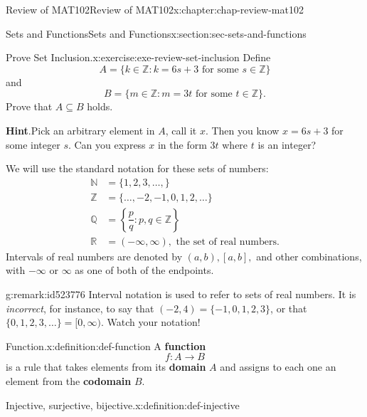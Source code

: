 \documentclass[oneside,10pt,]{book}
\newcommand{\blocktitlefont}{\relax}
\newcommand{\terminology}[1]{\textbf{#1}}
\numberwithin{equation}{section}
\newcommand{\amp}{&}
\begin{document}
\begin{chapterptx}{Review of MAT102}{}{Review of MAT102}{}{}{x:chapter:chap-review-mat102}
\begin{sectionptx}{Sets and Functions}{}{Sets and Functions}{}{}{x:section:sec-sets-and-functions}
\begin{inlineexercise}{Prove Set Inclusion.}{x:exercise:exe-review-set-inclusion}%
Define%
\begin{equation*}
A = \{k \in \mathbb{Z} : k = 6s + 3 \text{ for some } s \in \mathbb{Z}\}
\end{equation*}
and%
\begin{equation*}
B = \{m \in \mathbb{Z} : m = 3t \text{ for some } t \in \mathbb{Z}\}\text{.}
\end{equation*}
Prove that \(A \subseteq B\) holds.%
\par\smallskip%
\noindent\textbf{\blocktitlefont Hint}.\hypertarget{g:hint:id523676}{}\quad{}Pick an arbitrary element in \(A\), call it \(x\). Then you know \(x = 6s + 3\) for some integer \(s\). Can you express \(x\) in the form \(3t\) where \(t\) is an integer?%
\end{inlineexercise}%
We will use the standard notation for these sets of numbers: \label{g:notation:id523701}\label{g:notation:id523711}\label{g:notation:id523687}\label{g:notation:id523752}\label{g:notation:id523729}%
\begin{align*}
\mathbb{N} \amp = \{1,2,3,\ldots,\}\\
\mathbb{Z} \amp = \{\ldots,-2,-1,0,1,2,\ldots\}\\
\mathbb{Q} \amp = \left\{\dfrac{p}{q} : p,q \in \mathbb{Z}\right\}\\
\mathbb{R} \amp = (-\infty,\infty), \text{ the set of real numbers.}
\end{align*}
Intervals of real numbers are denoted by \((a,b), [a,b],\) and other combinations, with \(-\infty\) or \(\infty\) as one of both of the endpoints.%
\begin{remark}{}{g:remark:id523776}%
Interval notation is used to refer to sets of real numbers. It is \emph{incorrect}, for instance, to say that \((-2,4) = \{-1,0,1,2,3\}\), or that \(\{0,1,2,3,\ldots\} = [0,\infty)\). Watch your notation!%
\end{remark}
\begin{definition}{Function.}{x:definition:def-function}%
\label{g:notation:id523767} A \terminology{function}%
\begin{equation*}
f: A \rightarrow B
\end{equation*}
is a rule that takes elements from its \terminology{domain} \(A\) and assigns to each one an element from the \terminology{codomain} \(B\).%
\end{definition}
\begin{definition}{Injective, surjective, bijective.}{x:definition:def-injective}%

\end{definition}
\end{sectionptx}
\end{chapterptx}
\end{document}
